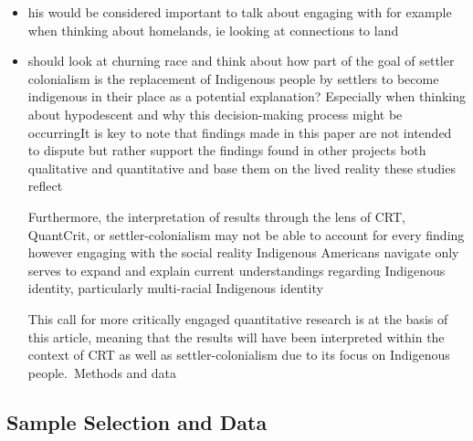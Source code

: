 \documentclass[
  12pt,
  letterpaper,
]{article}
\begin{document}
\begin{itemize}
\item
  his would be considered important to talk about engaging with for
  example when thinking about homelands, ie looking at connections to
  land
\item
  should look at churning race and think about how part of the goal of
  settler colonialism is the replacement of Indigenous people by
  settlers to become indigenous in their place as a potential
  explanation? Especially when thinking about hypodescent and why this
  decision-making process might be occurringIt is key to note that
  findings made in this paper are not intended to dispute but rather
  support the findings found in other projects both qualitative and
  quantitative and base them on the lived reality these studies reflect

  Furthermore, the interpretation of results through the lens of CRT,
  QuantCrit, or settler-colonialism may not be able to account for every
  finding however engaging with the social reality Indigenous Americans
  navigate only serves to expand and explain current understandings
  regarding Indigenous identity, particularly multi-racial Indigenous
  identity

  This call for more critically engaged quantitative research is at the
  basis of this article, meaning that the results will have been
  interpreted within the context of CRT as well as settler-colonialism
  due to its focus on Indigenous people.~Methods and data
\end{itemize}

\hypertarget{sample-selection-and-data}{%
\subsection{Sample Selection and Data}\label{sample-selection-and-data}}
\end{document}
